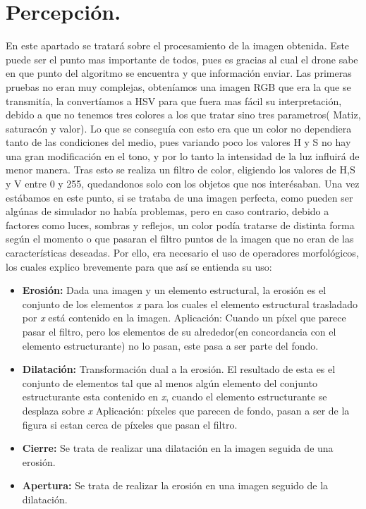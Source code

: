 \section{Percepci\'on.}
\hspace{1cm} En este apartado se tratar\'a sobre el procesamiento de la imagen obtenida. Este puede ser el punto mas importante de todos, pues es gracias al cual el drone sabe en que punto del algoritmo se encuentra y que informaci\'on enviar. Las primeras pruebas no eran muy complejas, obten\'iamos una imagen RGB que era la que se transmit\'ia, la convert\'iamos a HSV para que fuera mas f\'acil su interpretaci\'on, debido a que no tenemos tres colores a los que tratar sino tres parametros( Matiz, saturac\'on y valor). Lo que se consegu\'ia con esto era que un color no dependiera tanto de las condiciones del medio, pues variando poco los valores H y S no hay una gran modificaci\'on en el tono, y por lo tanto la intensidad de la luz influir\'a de menor manera. Tras esto se realiza un filtro de color, eligiendo los valores de H,S y V entre 0 y 255, quedandonos solo con los objetos que nos inter\'esaban. Una vez est\'abamos en este punto, si se trataba de una imagen perfecta, como pueden ser alg\'unas de simulador no hab\'ia problemas, pero en caso contrario, debido a factores como luces, sombras y reflejos, un color pod\'ia tratarse de distinta forma seg\'un el momento o que pasaran el filtro puntos de la imagen que no eran de las caracter\'isticas deseadas. Por ello,  era necesario el uso de operadores morfol\'ogicos, los cuales explico brevemente para que as\'i se entienda su uso: 
\begin{itemize}
	\item \textbf{Erosi\'on:} Dada una imagen y un elemento estructural, la erosi\'on es el conjunto de los elementos \textit{x} para los cuales el elemento estructural trasladado por \textit{x} est\'a contenido en la imagen. 
	\newline\hspace{1 cm} Aplicaci\'on: Cuando un p\'ixel que parece pasar el filtro, pero los elementos de su alrededor(en concordancia con el elemento estructurante) no lo pasan, este pasa a ser parte del fondo. 
	\item \textbf{Dilataci\'on:} Transformaci\'on dual a la erosi\'on. El resultado de esta es el conjunto de elementos tal que al menos alg\'un elemento del conjunto estructurante esta contenido en \textit{x}, cuando el elemento estructurante se desplaza sobre \textit{x}
	\newline\hspace{1 cm} Aplicaci\'on: p\'ixeles que parecen de fondo, pasan a ser de la figura si estan cerca de p\'ixeles que pasan el filtro.
	\item \textbf{Cierre:} Se trata de realizar una dilataci\'on en la imagen seguida de una erosi\'on.
	\item \textbf{Apertura:} Se trata de realizar la erosi\'on en una imagen seguido de la dilataci\'on.
\end{itemize}

